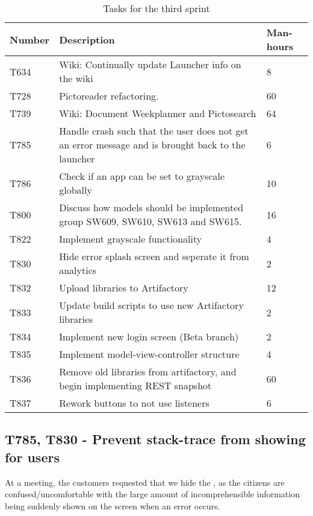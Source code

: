 \begin{table}[H]
\begin{centering}
\begin{tabular}{|l|p{9cm}|l|}
\hline
Number 	& Description & Man-hours \\ \hline
T634   	& Wiki: Continually update Launcher info on the wiki & 8\\\hline
T728  	& Pictoreader refactoring. & 60 \\ \hline
T739	& Wiki: Document Weekplanner and Pictosearch & 64\\ \hline
T785	& Handle crash such that the user does not get an error message and is
		  brought back to the launcher & 6\\ \hline
T786 	& Check if an app can be set to grayscale globally & 10\\ \hline
T800 	& Discuss how models should be implemented group SW609, SW610, SW613 and
		  SW615. & 16\\ \hline
T822 	& Implement grayscale functionality & 4\\ \hline
T830 	& Hide error splash screen and seperate it from analytics & 2\\ \hline
T832 	& Upload libraries to Artifactory & 12\\ \hline
T833 	& Update build scripts to use new Artifactory libraries & 2\\ \hline
T834 	& Implement new login screen (Beta branch) & 2\\ \hline
T835 	& Implement model-view-controller structure & 4\\ \hline
T836 	& Remove old libraries from artifactory, and begin implementing REST
snapshot & 60\\
\hline T837 	& Rework buttons to not use listeners & 6\\ \hline
\end{tabular}
\caption{Tasks for the third sprint}
\label{Tasks3}
\end{centering}
\end{table}

\subsection{T785, T830 - Prevent stack-trace from showing for
users}\label{T785-T830} 
At a meeting, the customers requested that we hide the
, as the citizens are confused/uncomfortable with the
large amount of incomprehensible information being suddenly shown on the screen
when an error occurs.\nl


